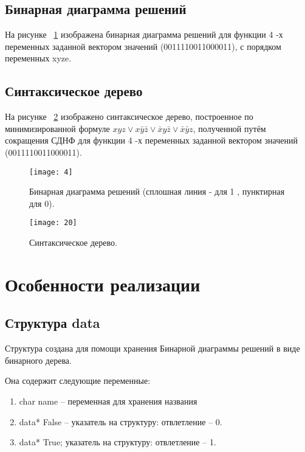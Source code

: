 \documentclass[10pt,a4paper,final]{article} %
\begin{document}
\subsection{Бинарная диаграмма решений}
На рисунке ~\ref{fig:рис4} изображена бинарная диаграмма решений для функции 4 -х переменных заданной вектором значений (0011110011000011), с порядком переменных xyze.



\subsection{Синтаксическое дерево}
На рисунке ~\ref{fig:рис5} изображено синтаксическое дерево, построенное  по минимизированной формуле $ xyz \lor x \bar {y} \bar {z} \lor \bar {x} y \bar {z} \lor\bar{x} \bar{y}z  $, полученной путём сокращения СДНФ для функции 4 -х переменных заданной вектором значений (0011110011000011).

\begin{figure}[h!]
	\centering
	\texttt{[image: 4]}
	\caption{Бинарная диаграмма решений (сплошная линия - для 1 , пунктирная для 0).}
	\label{fig:рис4}
\end{figure}

\begin{figure}[h!]
	\centering
	\texttt{[image: 20]}
	\caption{Синтаксическое дерево.}
		\label{fig:рис5}
\end{figure}


\newpage
\section{Особенности реализации}
\subsection{Структура data}
\par Структура создана для помощи хранения Бинарной диаграммы решений в виде бинарного дерева.
 \par Она содержит следующие переменные:
 \begin{enumerate}[itemsep=0pt,parsep=0pt,topsep=0pt,partopsep=0pt]
 	\item char name -- переменная для хранения названия
 	\item data* False -- указатель на структуру: отвлетление -- 0. 
 	\item data* True;  указатель на структуру: отвлетление -- 1. 
 	\end{enumerate}
 	
\end{document}
